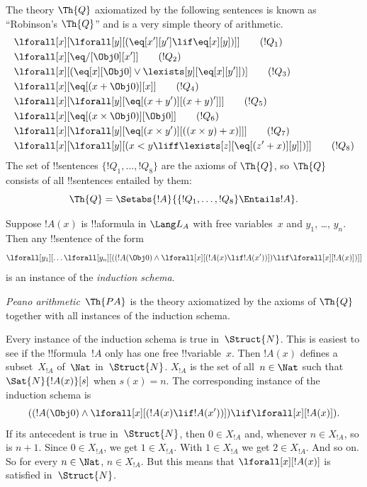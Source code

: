 \documentclass[../../../include/open-logic-section]{subfiles}
\begin{document}
\begin{defn}
The theory $\Th{Q}$ axiomatized by the following sentences is known
as ``Robinson's $\Th{Q}$'' and is a very simple theory of arithmetic.
\begin{align*}
& \lforall[x][\lforall[y][(\eq[x'][y'] \lif \eq[x][y])]] \tag{$!Q_1$}\\
& \lforall[x][\eq/[\Obj 0][x']] \tag{$!Q_2$}\\
& \lforall[x][(\eq[x][\Obj 0] \lor \lexists[y][\eq[x][y']])] \tag{$!Q_3$}\\
& \lforall[x][\eq[(x + \Obj 0)][x]] \tag{$!Q_4$}\\
& \lforall[x][\lforall[y][\eq[(x + y')][(x + y)']]] \tag{$!Q_5$}\\
& \lforall[x][\eq[(x \times \Obj 0)][\Obj 0]] \tag{$!Q_6$}\\
& \lforall[x][\lforall[y][\eq[(x \times y')][((x \times y) + x)]]] \tag{$!Q_7$}\\
& \lforall[x][\lforall[y][(x < y \liff \lexists[z][\eq[(z' + x)][y]])]] \tag{$!Q_8$}
\end{align*}
The set of !!{sentence}s $\{!Q_1, \dots, !Q_8\}$ are the axioms of
$\Th{Q}$, so $\Th{Q}$ consists of all !!{sentence}s entailed by them:
\[
\Th{Q} = \Setabs{!A}{\{!Q_1, \dots, !Q_8\} \Entails !A}.
\]
\end{defn}

\begin{defn}
Suppose $!A(x)$ is !!a{formula} in $\Lang L_A$ with free variables~$x$
and $y_1$, \dots, $y_n$. Then any !!{sentence} of the form
\[
\lforall[y_1][\dots\lforall[y_n][((!A(\Obj 0) \land \lforall[x][(!A(x)
\lif !A(x'))]) \lif \lforall[x][!A(x)])]]
\]
is an instance of the \emph{induction schema}.

\emph{Peano arithmetic}~$\Th{PA}$ is the theory axiomatized by the
axioms of $\Th{Q}$ together with all instances of the induction
schema.
\end{defn}

\begin{explain}
Every instance of the induction schema is true in~$\Struct{N}$. This
is easiest to see if the !!{formula}~$!A$ only has one free
!!{variable}~$x$.  Then $!A(x)$ defines a subset~$X_{!A}$ of~$\Nat$
in~$\Struct{N}$.  $X_{!A}$ is the set of all~$n \in \Nat$ such that
$\Sat{N}{!A(x)}[s]$ when $s(x) = n$.  The corresponding instance of
the induction schema is
\[
((!A(\Obj 0) \land \lforall[x][(!A(x) \lif !A(x'))]) \lif 
  \lforall[x][!A(x)]).
\]
If its antecedent is true in~$\Struct{N}$, then $0 \in X_{!A}$ and,
whenever $n \in X_{!A}$, so is $n+1$.  Since $0 \in X_{!A}$, we get
$1 \in X_{!A}$. With $1 \in X_{!A}$ we get $2 \in X_{!A}$. And so on.
So for every $n \in \Nat$, $n \in X_{!A}$. But this means that
$\lforall[x][!A(x)]$ is satisfied in~$\Struct{N}$.
\end{explain}
\end{document}
